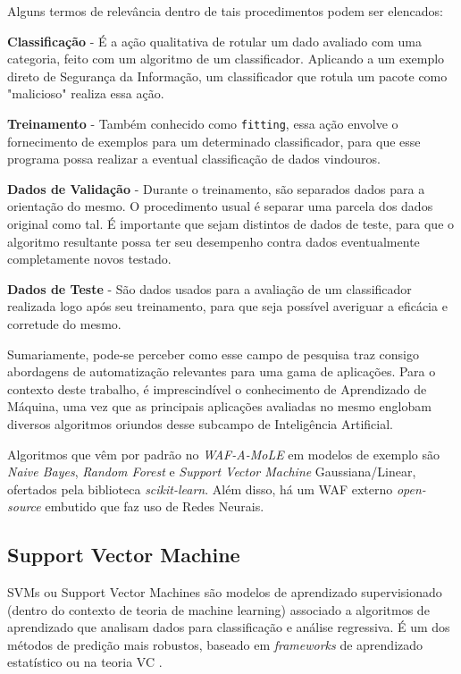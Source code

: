 Alguns termos de relevância dentro de tais procedimentos podem ser elencados:
\begin{alineas}
\item \textbf{Classificação} - É a ação qualitativa de rotular um dado avaliado com uma categoria, feito com um algoritmo de um classificador. Aplicando a um exemplo direto de Segurança da Informação, um classificador que rotula um pacote como "malicioso" realiza essa ação.
\item \textbf{Treinamento} - Também conhecido como \verb+fitting+, essa ação envolve o fornecimento de exemplos para um determinado classificador, para que esse programa possa realizar a eventual classificação de dados vindouros.
\item \textbf{Dados de Validação} - Durante o treinamento, são separados dados para a orientação do mesmo. O procedimento usual é separar uma parcela dos dados original como tal. É importante que sejam distintos de dados de teste, para que o algoritmo resultante possa ter seu desempenho contra dados eventualmente completamente novos testado.
\item \textbf{Dados de Teste} - São dados usados para a avaliação de um classificador realizada logo após seu treinamento, para que seja possível averiguar a eficácia e corretude do mesmo.
\end{alineas}

Sumariamente, pode-se perceber como esse campo de pesquisa traz consigo abordagens de automatização relevantes para uma gama de aplicações. Para o contexto deste trabalho, é imprescindível o conhecimento de Aprendizado de Máquina, uma vez que as principais aplicações avaliadas no mesmo englobam diversos algoritmos oriundos desse subcampo de Inteligência Artificial.

Algoritmos que vêm por padrão no \textit{WAF-A-MoLE} em modelos de exemplo são \textit{Naive Bayes}, \textit{Random Forest} e \textit{Support Vector Machine} Gaussiana/Linear, ofertados pela biblioteca \textit{scikit-learn}. Além disso, há um WAF externo \textit{open-source} embutido que faz uso de Redes Neurais.

\subsection{Support Vector Machine}
SVMs ou Support Vector Machines são modelos de aprendizado supervisionado (dentro do contexto de teoria de machine learning) associado a algoritmos de aprendizado que analisam dados para classificação e análise regressiva. É um dos métodos de predição mais robustos, baseado em \textit{frameworks} de aprendizado estatístico ou na teoria VC \cite{ben2001_vapnik_support}.

